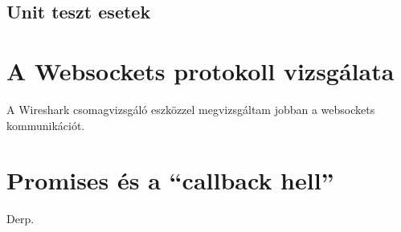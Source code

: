 \subsection{Unit teszt esetek}










\section{A Websockets protokoll vizsgálata}

A Wireshark csomagvizsgáló eszközzel megvizsgáltam jobban a websockets kommunikációt.  




\section{Promises és a ``callback hell''}
Derp.


